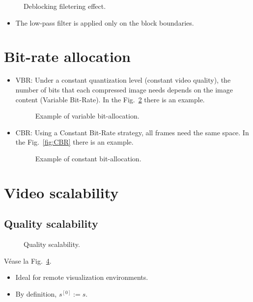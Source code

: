 \begin{figure}
  \caption{Deblocking filetering effect.}
  \label{fig:350px-Deblock1}
\end{figure}

\begin{itemize}
\tightlist
\item
  The low-pass filter is applied only on the block boundaries.
\end{itemize}

\section{Bit-rate allocation}
\begin{itemize}
\item
  VBR: Under a constant quantization level (constant video quality),
  the number of bits that each compressed image needs depends on the
  image content (Variable Bit-Rate). In the
  Fig.~\ref{fig:closed-loop-1_ir} there is an
  example.
  \begin{figure}
    \caption{Example of variable bit-allocation.}
    \label{fig:closed-loop-1_ir}
  \end{figure}
  
\item
  CBR: Using a Constant Bit-Rate strategy, all frames need the same
  space. In the
  Fig.~\ref{fig:CBR} there is an
  example.
  \begin{figure}
    \caption{Example of constant bit-allocation.}
    \label{CBR}
  \end{figure}
\end{itemize}

\section{Video scalability}
\subsection{Quality scalability}

\begin{figure}
  \caption{Quality scalability.}
  \label{fig:quality-scalability}
\end{figure}

Véase la Fig.~\ref{fig:quality-scalability}.
\begin{itemize}
\item
  Ideal for remote visualization environments.
\item
  By definition, $s^{[0]}:=s$.
\end{itemize}

